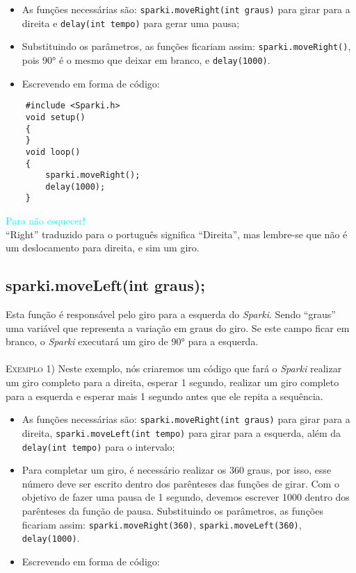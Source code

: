     \begin{itemize}
        \item As funções necessárias são: \texttt{sparki.moveRight(int graus)} para girar para a direita e \texttt{delay(int tempo)} para gerar uma pausa;
        \item Substituindo os parâmetros, as funções ficariam assim: \texttt{sparki.moveRight()}, pois 90° é o mesmo que deixar em branco, e \texttt{delay(1000)}.
        \item Escrevendo em forma de código:
    \end{itemize}
    
    \begin{verbatim}
    #include <Sparki.h>
    void setup()
    {
    }
    void loop()
    {
        sparki.moveRight();
        delay(1000);
    }
    \end{verbatim}
    
    \begin{center}
    \textcolor{cyan}{Para não esquecer!}
    \\``Right'' traduzido para o português significa ``Direita'', mas lembre-se que não é um deslocamento para direita, e sim um giro.
    \end{center}
    
\subsection{sparki.moveLeft(int graus);}
    Esta função é responsável pelo giro para a esquerda do \textsl{Sparki}. Sendo ``graus'' uma variável que representa a variação em graus do giro. Se este campo ficar em branco, o \textsl{Sparki} executará um giro de 90° para a esquerda.
    \\
    \\
    \textsc{Exemplo 1)} Neste exemplo, nós criaremos um código que fará o \textsl{Sparki} realizar um giro completo para a direita, esperar 1 segundo, realizar um giro completo para a esquerda e esperar mais 1 segundo antes que ele repita a sequência.
    
    \begin{itemize}
        \item As funções necessárias são: \texttt{sparki.moveRight(int graus)} para girar para a direita, \texttt{sparki.moveLeft(int tempo)} para girar para a esquerda, além da \texttt{delay(int tempo)} para o intervalo;
        \item Para completar um giro, é necessário realizar os 360 graus, por isso, esse número deve ser escrito dentro dos parênteses das funções de girar. Com o objetivo de fazer uma pausa de 1 segundo, devemos escrever 1000 dentro dos parênteses da função de pausa. Substituindo os parâmetros, as funções ficariam assim: \texttt{sparki.moveRight(360)}, \texttt{sparki.moveLeft(360)}, \texttt{delay(1000)}.
        \item Escrevendo em forma de código:
    \end{itemize}
    
